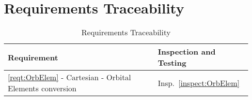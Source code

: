 \section{Requirements Traceability}

\begin{longtable}[c]{||p{3.5in}|p{3.5in}|}
\caption{Requirements Traceability} \\[6pt]
\hline
{\bf Requirement} & {\bf Inspection and Testing} \\ 
\hline \hline
\endhead
\ref{reqt:OrbElem} - Cartesian - Orbital Elements conversion &
  Insp.~\ref{inspect:OrbElem} \\ \hline


\end{longtable}
